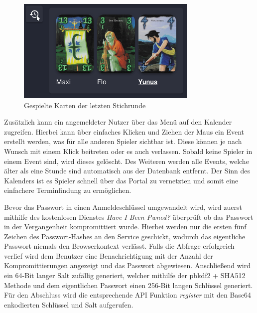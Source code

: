 \begin{figure}[h]
	\centering
	\includegraphics[height=5cm]{images/last-round.png}
	\caption{Gespielte Karten der letzten Stichrunde}
	\label{fig:last-round}
\end{figure}

Zusätzlich kann ein angemeldeter Nutzer über das Menü auf den Kalender zugreifen. Hierbei kann über einfaches Klicken und Ziehen der Maus ein Event erstellt werden, was für alle anderen Spieler sichtbar ist. Diese können je nach Wunsch mit einem Klick beitreten oder es auch verlassen. Sobald keine Spieler in einem Event sind, wird dieses gelöscht. Des Weiteren werden alle Events, welche älter als eine Stunde sind automatisch aus der Datenbank entfernt. Der Sinn des Kalenders ist es Spieler schnell über das Portal zu vernetzten und somit eine einfachere Terminfindung zu ermöglichen.

\label{sec:frontend-registrierung}
Bevor das Passwort in einen Anmeldeschlüssel umgewandelt wird, wird zuerst mithilfe des kostenlosen Dienstes \textit{Have I Been Pwned?} überprüft ob das Passwort in der Vergangenheit kompromittiert wurde. Hierbei werden nur die ersten fünf Zeichen des Passwort-Hashes an den Service geschickt, wodurch das eigentliche Passwort niemals den Browserkontext verlässt. Falls die Abfrage erfolgreich verlief wird dem Benutzer eine Benachrichtigung mit der Anzahl der Kompromittierungen angezeigt und das Passwort abgewiesen. Anschließend wird ein 64-Bit langer Salt zufällig generiert, welcher mithilfe der \gls{pbkdf2} + SHA512 Methode und dem eigentlichen Passwort einen 256-Bit langen Schlüssel generiert. Für den Abschluss wird die entsprechende API Funktion \textit{register} mit den Base64 enkodierten Schlüssel und Salt aufgerufen.
